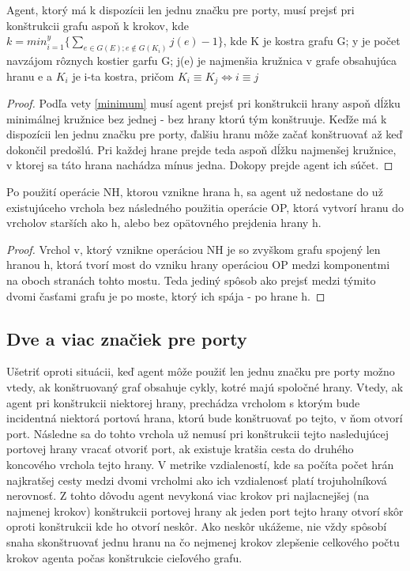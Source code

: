 \begin{lem}
Agent, ktorý má k dispozícii len jednu značku pre porty, 
musí prejsť pri konštrukcii grafu aspoň k krokov, kde 
$k =min_{i=1}^{y}\{\sum_{e \in G(E); e \notin G(K_{i})} j(e)-1  \}$, 
kde K je kostra grafu G; y je počet navzájom rôznych kostier garfu G; j(e) je najmenšia kružnica v
grafe obsahujúca hranu e a $K_{i}$ je i-ta kostra, pričom $K_{i} \equiv K_{j}
\iff i \equiv j$
\end{lem}
\begin{proof}
Podľa vety \ref{minimum} musí agent prejsť pri konštrukcii hrany aspoň dĺžku
minimálnej kružnice bez jednej - bez hrany ktorú tým konštruuje. Keďže má k
dispozícii len jednu značku pre porty, ďalšiu hranu môže začať konštruovať
až keď dokončil predošlú. Pri každej hrane prejde teda aspoň dĺžku
najmenšej kružnice, v ktorej sa táto hrana nachádza mínus jedna. Dokopy
prejde agent ich súčet.
\end{proof}



\begin{lem}
Po použití operácie NH, ktorou vznikne hrana h, sa agent už nedostane do
už existujúceho vrchola bez následného použitia
operácie OP, ktorá vytvorí hranu do vrcholov starších ako h,
alebo bez opätovného prejdenia hrany h.
\end{lem}
\begin{proof}
Vrchol v, ktorý vznikne operáciou NH je so zvyškom grafu spojený len hranou
h, ktorá tvorí most do vzniku hrany operáciou OP medzi komponentmi na oboch
stranách tohto mostu. Teda jediný spôsob ako prejsť medzi týmito dvomi
časťami grafu je po moste, ktorý ich spája - po hrane h.
\end{proof}



\subsection{Dve a viac značiek pre porty}
Ušetriť oproti situácii, keď agent môže použiť len jednu značku pre porty
možno vtedy, ak konštruovaný graf obsahuje cykly, kotré majú spoločné hrany.
Vtedy, ak agent pri konštrukcii niektorej hrany, 
prechádza vrcholom s ktorým bude incidentná niektorá
portová
hrana, ktorú bude konštruovať po tejto,
 v ňom otvorí port. Následne sa do tohto vrchola už nemusí pri konštrukcii
tejto nasledujúcej portovej hrany vracať otvoriť port, ak existuje
kratšia cesta do druhého koncového vrchola tejto hrany. V metrike
vzdialeností, kde sa počíta počet hrán najkratšej cesty medzi dvomi vrcholmi
ako ich vzdialenosť platí trojuholníková nerovnosť. Z tohto dôvodu agent
nevykoná viac krokov pri najlacnejšej (na najmenej krokov) 
konštrukcii portovej hrany ak jeden port tejto hrany otvorí skôr oproti
konštrukcii kde ho otvorí neskôr.
Ako neskôr ukážeme, nie vždy spôsobí snaha skonštruovať jednu hranu na čo
nejmenej krokov zlepšenie celkového počtu krokov agenta počas konštrukcie
cieľového grafu.


